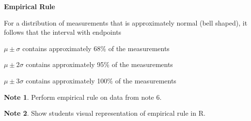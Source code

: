 \documentclass[11pt]{article}
\theoremstyle{definition}
\newtheorem{note}{Note}
\begin{document}
\begin{shaded}

	\textbf{Empirical Rule}
	
	For a distribution of measurements that is approximately normal (bell shaped), it follows that the interval with endpoints
	
	\hspace{10mm} $\mu \pm \sigma$ contains approximately 68\% of the measurements
	
	\hspace{10mm} $\mu \pm 2\sigma$ contains approximately 95\% of the measurements
	
	\hspace{10mm} $\mu \pm 3\sigma$ contains approximately 100\% of the measurements

\end{shaded}

\begin{note}
	Perform empirical rule on data from note 6.
\end{note}

\begin{note}
	Show students visual representation of empirical rule in R.
\end{note}
\end{document}

